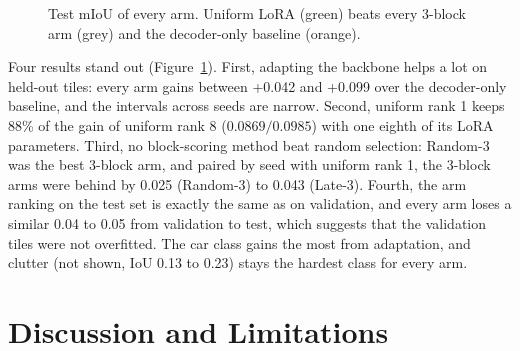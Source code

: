 \documentclass[11pt,a4paper]{report}
\begin{document}
\begin{figure}[t]
\centering
{}
\caption{Test mIoU of every arm. Uniform LoRA (green) beats every 3-block arm (grey) and the decoder-only baseline (orange).}
\label{fig:testarms}
\end{figure}

Four results stand out (Figure~\ref{fig:testarms}). First, adapting the backbone helps a lot on held-out tiles: every arm gains between +0.042 and +0.099 over the decoder-only baseline, and the intervals across seeds are narrow. Second, uniform rank 1 keeps 88\% of the gain of uniform rank 8 ($0.0869 / 0.0985$) with one eighth of its LoRA parameters. Third, no block-scoring method beat random selection: Random-3 was the best 3-block arm, and paired by seed with uniform rank 1, the 3-block arms were behind by 0.025 (Random-3) to 0.043 (Late-3). Fourth, the arm ranking on the test set is exactly the same as on validation, and every arm loses a similar 0.04 to 0.05 from validation to test, which suggests that the validation tiles were not overfitted. The car class gains the most from adaptation, and clutter (not shown, IoU 0.13 to 0.23) stays the hardest class for every arm.

\chapter{Discussion and Limitations}
\label{ch:discussion}
\end{document}
